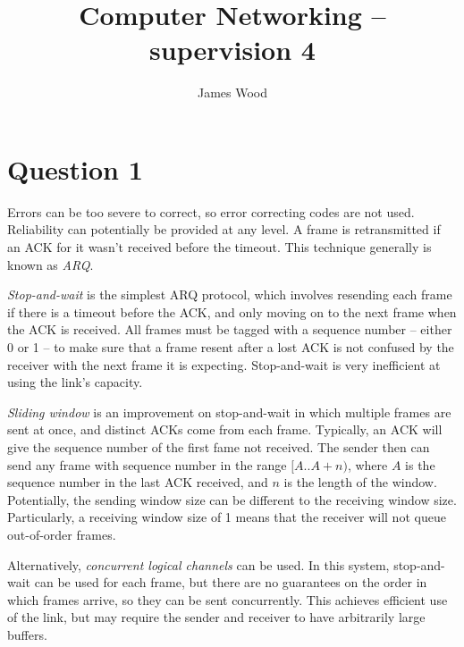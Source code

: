 \documentclass{article}
\begin{document}
\title{Computer Networking -- supervision 4}
\author{James Wood}
\maketitle

\section*{Question 1}
Errors can be too severe to correct, so error correcting codes are not used. Reliability can potentially be provided at any level. A frame is retransmitted if an ACK for it wasn't received before the timeout. This technique generally is known as \textit{ARQ}.

\textit{Stop-and-wait} is the simplest ARQ protocol, which involves resending each frame if there is a timeout before the ACK, and only moving on to the next frame when the ACK is received. All frames must be tagged with a sequence number -- either 0 or 1 -- to make sure that a frame resent after a lost ACK is not confused by the receiver with the next frame it is expecting. Stop-and-wait is very inefficient at using the link's capacity.

\textit{Sliding window} is an improvement on stop-and-wait in which multiple frames are sent at once, and distinct ACKs come from each frame. Typically, an ACK will give the sequence number of the first fame not received. The sender then can send any frame with sequence number in the range $[A..A + n)$, where $A$ is the sequence number in the last ACK received, and $n$ is the length of the window. Potentially, the sending window size can be different to the receiving window size. Particularly, a receiving window size of 1 means that the receiver will not queue out-of-order frames.

Alternatively, \textit{concurrent logical channels} can be used. In this system, stop-and-wait can be used for each frame, but there are no guarantees on the order in which frames arrive, so they can be sent concurrently. This achieves efficient use of the link, but may require the sender and receiver to have arbitrarily large buffers.
\end{document}
